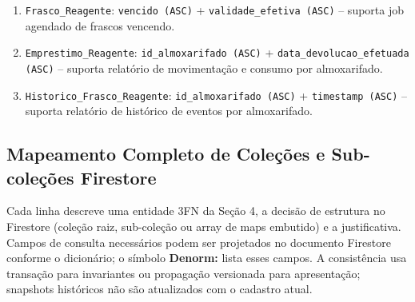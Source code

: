 \begin{enumerate}
    \item 	\texttt{Frasco\_Reagente}: 	\texttt{vencido (ASC)} + 	\texttt{validade\_efetiva (ASC)} -- suporta job agendado de frascos vencendo.
    \item 	\texttt{Emprestimo\_Reagente}: 	\texttt{id\_almoxarifado (ASC)} + 	\texttt{data\_devolucao\_efetuada (ASC)} -- suporta relatório de movimentação e consumo por almoxarifado.
    \item 	\texttt{Historico\_Frasco\_Reagente}: 	\texttt{id\_almoxarifado (ASC)} + 	\texttt{timestamp (ASC)} -- suporta relatório de histórico de eventos por almoxarifado.
\end{enumerate}
\subsection{Mapeamento Completo de Coleções e Sub-coleções Firestore}
\label{subsec:mapeamento-colecoes}

\begin{explicacao}
Cada linha descreve uma entidade 3FN da Seção 4, a decisão de estrutura no Firestore (coleção raiz, sub-coleção ou array de maps embutido) e a justificativa. Campos de consulta necessários podem ser projetados no documento Firestore conforme o dicionário; o símbolo \textbf{Denorm:} lista esses campos. A consistência usa transação para invariantes ou propagação versionada para apresentação; snapshots históricos não são atualizados com o cadastro atual.
\end{explicacao}

\small

